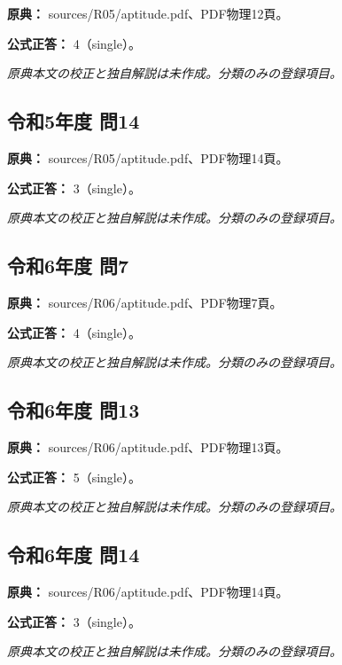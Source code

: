 \noindent\textbf{原典：} sources/R05/aptitude.pdf、PDF物理12頁。

\textbf{公式正答：} 4（single）。

\par\textit{原典本文の校正と独自解説は未作成。分類のみの登録項目。}

\subsection{令和5年度 問14}
\label{q:r05-reg-apt-14}

\noindent\textbf{原典：} sources/R05/aptitude.pdf、PDF物理14頁。

\textbf{公式正答：} 3（single）。

\par\textit{原典本文の校正と独自解説は未作成。分類のみの登録項目。}

\subsection{令和6年度 問7}
\label{q:r06-reg-apt-07}

\noindent\textbf{原典：} sources/R06/aptitude.pdf、PDF物理7頁。

\textbf{公式正答：} 4（single）。

\par\textit{原典本文の校正と独自解説は未作成。分類のみの登録項目。}

\subsection{令和6年度 問13}
\label{q:r06-reg-apt-13}

\noindent\textbf{原典：} sources/R06/aptitude.pdf、PDF物理13頁。

\textbf{公式正答：} 5（single）。

\par\textit{原典本文の校正と独自解説は未作成。分類のみの登録項目。}

\subsection{令和6年度 問14}
\label{q:r06-reg-apt-14}

\noindent\textbf{原典：} sources/R06/aptitude.pdf、PDF物理14頁。

\textbf{公式正答：} 3（single）。

\par\textit{原典本文の校正と独自解説は未作成。分類のみの登録項目。}

